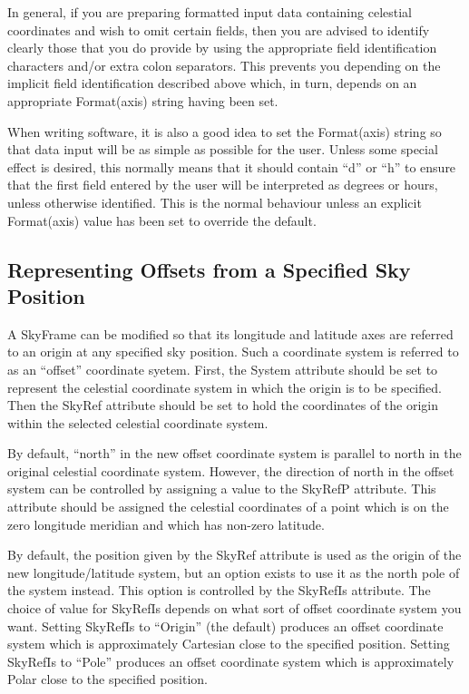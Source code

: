 \documentclass[twoside,11pt]{article}
\begin{document}
In general, if you are preparing formatted input data containing
celestial coordinates and wish to omit certain fields, then you are
advised to identify clearly those that you do provide by using the
appropriate field identification characters and/or extra colon
separators. This prevents you depending on the implicit field
identification described above which, in turn, depends on an
appropriate Format(axis) string having been set.

When writing software, it is also a good idea to set the Format(axis)
string so that data input will be as simple as possible for the
user. Unless some special effect is desired, this normally means that
it should contain ``d'' or ``h'' to ensure that the first field
entered by the user will be interpreted as degrees or hours, unless
otherwise identified. This is the normal behaviour unless an explicit
Format(axis) value has been set to override the default.

\subsection{Representing Offsets from a Specified Sky Position}
A SkyFrame can be modified so that its longitude and latitude axes are
referred to an origin at any specified sky position. Such a coordinate
system is referred to as an ``offset'' coordinate syetem. First, the System
attribute should be set to represent the celestial coordinate system in
which the origin is to be specified. Then the SkyRef attribute should be
set to hold the coordinates of the origin within the selected celestial
coordinate system. 

By default, ``north'' in the new offset coordinate system is parallel to
north in the original celestial coordinate system. However, the direction
of north in the offset system can be controlled by assigning a value to
the SkyRefP attribute. This attribute should be assigned the celestial
coordinates of a point which is on the zero longitude meridian and which
has non-zero latitude.

By default, the position given by the SkyRef attribute is used as the
origin of the new longitude/latitude system, but an option exists to use
it as the north pole of the system instead. This option is controlled by
the SkyRefIs attribute. The choice of value for SkyRefIs depends on what
sort of offset coordinate system you want. Setting SkyRefIs to
``Origin'' (the default) produces an offset coordinate system which is
approximately Cartesian close to the specified position. Setting SkyRefIs
to
``Pole'' produces an offset coordinate system which is approximately Polar
close to the specified position. 
\end{document}

